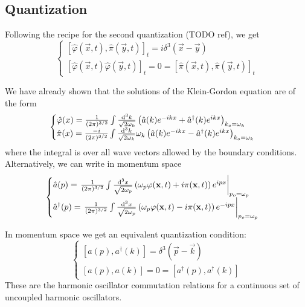 \subsection{Quantization}

Following the recipe for the second quantization (TODO ref), we get
\[ \begin{cases}
\left[\hat{\varphi}(\vec{x},t), \hat{\pi}(\vec{y},t)\right]_t = i\delta^3(\vec{x}- \vec{y}) \\
\left[\hat{\varphi}(\vec{x},t)\hat{\varphi}(\vec{y},t)\right]_t = 0 = \left[\hat{\pi}(\vec{x},t), \hat{\pi}(\vec{y},t)\right]_t
\end{cases} \]

We have already shown that the solutions of the Klein-Gordon equation are of the form 
\[ \begin{cases}
\hat{\varphi}(x) = \frac{1}{(2\pi)^{3/2}} \int \frac{\operatorname{d \!}{^3k}}{\sqrt{2\omega_k}} \left(\hat{a}(k)e^{-ikx} + \hat{a}^\dagger(k)e^{ikx}\right)_{k_o=\omega_k} \\
\hat{\pi}(x) = \frac{-i}{(2\pi)^{3/2}} \int \frac{\operatorname{d \!}{^3k}}{\sqrt{2\omega_k}} \omega_k \left(\hat{a}(k)e^{-ikx} - \hat{a}^\dagger(k)e^{ikx}\right)_{k_o=\omega_k}
\end{cases} \]
where the integral is over all wave vectors allowed by the boundary conditions.
Alternatively, we can write in momentum space
\[ \begin{cases}
\hat{a}(p) = \left. \frac{1}{(2\pi)^{3/2}} \int \frac{\operatorname{d \!}{^3x}}{\sqrt{2\omega_p}} \left(\omega_p\varphi(\boldsymbol{\mathrm{x}},t)+i\pi(\boldsymbol{\mathrm{x}},t)\right)e^{ipx}\right|_{p_o=\omega_p} \\
\hat{a}^\dagger(p) = \left. \frac{1}{(2\pi)^{3/2}} \int \frac{\operatorname{d \!}{^3x}}{\sqrt{2\omega_p}} \left(\omega_p\varphi(\boldsymbol{\mathrm{x}},t)-i\pi(\boldsymbol{\mathrm{x}},t)\right)e^{-ipx}\right|_{p_o=\omega_p}
\end{cases} \]

In momentum space we get an equivalent quantization condition:
\[ \begin{cases}
\left[a(p), a^\dagger(k)\right] = \delta^3(\vec{p}- \vec{k}) \\
\left[a(p),a(k)\right] = 0 = \left[a^\dagger(p), a^\dagger(k)\right]
\end{cases} \]
These are the harmonic oscillator commutation relations for a continuous set of uncoupled harmonic oscillators.


